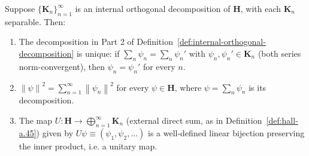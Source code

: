 \begin{lemma}
    \label{lmm:internal-decomposition-unitary}
    \leanok
    Suppose $\{ \mathbf{K}_n \}_{n=1}^\infty$ is an internal orthogonal decomposition of $\mathbf{H}$, with each $\mathbf{K}_n$ separable. Then:
    \begin{enumerate}
        \item The decomposition in Part 2 of Definition~\ref{def:internal-orthogonal-decomposition} is unique: if $\sum_n \psi_n = \sum_n \psi_n'$ with $\psi_n, \psi_n' \in \mathbf{K}_n$ (both series norm-convergent), then $\psi_n = \psi_n'$ for every $n$.
        \item $\left\| \psi \right\|^2 = \sum_{n=1}^\infty \left\| \psi_n \right\|^2$ for every $\psi \in \mathbf{H}$, where $\psi = \sum_n \psi_n$ is its decomposition.
        \item The map $U : \mathbf{H} \to \bigoplus_{n=1}^\infty \mathbf{K}_n$ (external direct sum, as in Definition~\ref{def:hall-a.45}) given by $U\psi \equiv (\psi_1, \psi_2, \ldots)$ is a well-defined linear bijection preserving the inner product, i.e. a unitary map.
    \end{enumerate}
\end{lemma}
